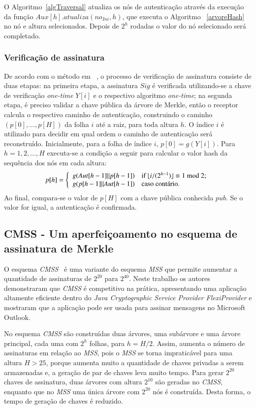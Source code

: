 \documentclass{SBCbookchapter}
\begin{document}
\begin{otherlanguage}{brazilian}
O Algoritmo~\ref{algTraversal} atualiza os nós de autenticação através da execução da função $Aux[h].atualiza(no_{Ini}, h)$, que executa o Algoritmo ~\ref{arvoreHash} no nó e altura selecionados. 
Depois de $2^h$ rodadas o valor do nó selecionado será completado.

\subsubsection{Verificação de assinatura} De acordo com o método em ~\cite{bernst:09}, o processo de verificação de assinatura consiste de duas etapas: na primeira etapa, a assinatura $Sig$ é verificada utilizando-se a chave de verificação \textit{one-time} $Y[i]$ e o res\-pectivo algoritmo \textit{one-time}; na segunda etapa, é preciso validar a chave pública da árvore de Merkle, então o receptor calcula o respectivo caminho de autenticação, construindo o caminho $(p[0],...,p[H])$ da folha $i$ até a raiz, para toda altura $h$. O índice $i$ é utilizado para decidir em qual ordem o ca\-minho de autenticação será recons\-truído. 
Inicialmente, para a folha de índice $i$, $p[0]=g(Y[i])$. Para $h=1,2,\ldots,H$ executa-se a condição a seguir para calcular o valor hash da sequência dos nós em cada altura:
\[ p[h]  = \left \{  \begin{array}{ll}
 g( Aut[h-1] \| p[h-1] )& \mbox{if $ \lfloor i/(2^{h-1})\rfloor \equiv 1 \ \rm{mod}\ 2 $;} \\

g(p[h-1] \| Aut[h-1])  & \mbox{caso contário.}
\end{array}
\right. \]
Ao final, compara-se o valor de $p[H]$ com a chave pública conhecida $pub$. Se o valor for igual, a autenticação é confirmada.

\subsection{CMSS - Um aperfeiçoamento no esquema de assinatura de Merkle}
O esquema \textit{CMSS}~\cite{buch:06}  é uma variante do esquema \textit{MSS} que permite aumentar a quantidade de assinaturas de $2^{20}$ para $2^{40}$. 
Neste trabalho os autores demons\-traram que \textit{CMSS} é competitivo na prática, apresentando uma aplicação altamente eficiente dentro do \textit{Java Cryptographic Service Provider FlexiProvider} e mostraram que a aplicação pode ser usada para assinar mensagens no Microsoft Outlook.

No esquema \textit{CMSS} são construídas duas árvores, uma subárvore e uma árvore principal, cada uma com $2^h$ folhas, para $h=H/2$. 
Assim, aumenta o número de assinaturas em relação ao \textit{MSS}, pois o \textit{MSS} se torna impraticável para uma altura $H>25$, porque aumenta muito a quantidade de chaves privadas a serem armazenadas e, a geração de par de chaves leva muito tempo. 
Para gerar $2^{20}$ chaves de assinatura, duas árvores com altura $2^{10}$ são geradas no \textit{CMSS}, enquanto que no \textit{MSS} uma única árvore com $2^{20}$ nós é construída. 
Desta forma, o tempo de geração de chaves é reduzido.


\end{otherlanguage}
\end{document}
